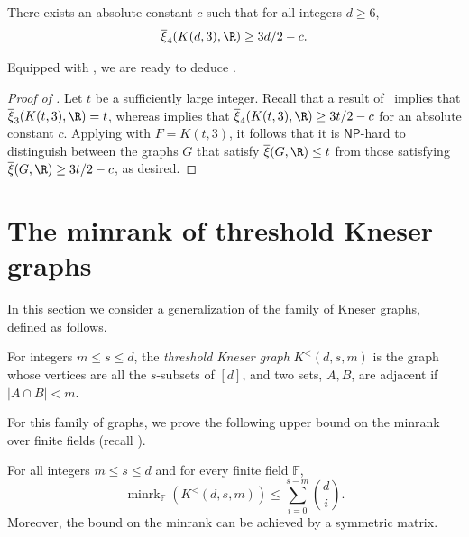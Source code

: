 \documentclass{toc}
\newcommand{\Fset}{\mathbb{F}}
\newcommand{\NP}{\mathsf{NP}}
\newcommand{\od}{\overline{\xi}}
\newcommand{\minrank}{\mathop{\mathrm{minrk}}}
\newcommand\Kneser[3]{K^<(#1,#2,#3)}
\begin{document}
\begin{corollary}\label{cor:3/2}
There exists an absolute constant $c$ such that for all integers $d \geq 6$,
\[\od_{4}(K(d,3),\R) \geq 3d/2-c.\]
\end{corollary}

Equipped with , we are ready to deduce .

\begin{proof}[Proof of ]
Let $t$ be a sufficiently large integer. Recall that a result of~\cite{BukhC18} implies that $\od_3(K(t,3),\R) = t$, whereas  implies that $\od_{4}(K(t,3),\R) \geq 3t/2-c$ for an absolute constant $c$.
Applying  with $F = K(t,3)$, it follows that it is $\NP$-hard to 
%
%
distinguish between the graphs $G$ that satisfy $\od(G,\R) \leq t$ from those satisfying $\od(G,\R) \geq 3t/2-c$, as desired.
\end{proof}


%
\section{The minrank of threshold Kneser graphs}\label{sec:ODofGenKneser}

In this section we consider a generalization of the family of
Kneser graphs, defined as follows.  %

%
\begin{definition}\label{def:GenKneser}
%
  For integers $m \leq s \leq d$, the
%
\emph{threshold Kneser graph}   %
$\Kneser{d}{s}{m}$ is the graph whose vertices are all the $s$-subsets of $[d]$,
%
and   %
two sets, $A,B$, %
are adjacent if $|A \cap B| < m$.
\end{definition}

For this family of graphs, we prove the following upper bound on the minrank
%
%
over finite fields (recall ).

\begin{theorem}\label{thm:minrk_Kneser}
For all integers $m \leq s \leq d$ and for every finite field $\Fset$,
\[{\minrank}_{\Fset}(\Kneser{d}{s}{m}) \leq \sum_{i=0}^{s-m}\binom{d}{i}.\]
Moreover, the bound on the minrank can be achieved by a symmetric matrix.
\end{theorem}
\end{document}
